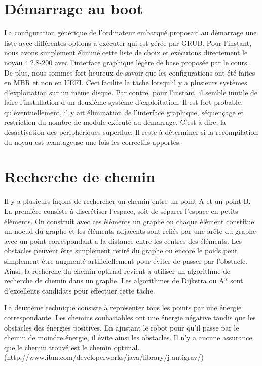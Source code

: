 \section{Démarrage au boot}
La configuration générique de l’ordinateur embarqué proposait au démarrage une liste avec différentes options à exécuter qui est gérée par GRUB. Pour l’instant, nous avons simplement éliminé cette liste de choix et exécutons directement le noyau 4.2.8-200 avec l’interface graphique légère de base proposée par le cours. De plus, nous sommes fort heureux de savoir que les configurations ont été faites en MBR et non en UEFI. Ceci facilite la tâche lorsqu’il y a plusieurs systèmes d’exploitation sur un même disque. Par contre, pour l’instant, il semble inutile de faire l’installation d’un deuxième système d’exploitation. Il est fort probable, qu’éventuellement, il y ait élimination de l’interface graphique, séquençage et restriction du nombre de module exécuté au démarrage. C’est-à-dire, la désactivation des périphériques superflue. Il reste à déterminer si la recompilation du noyau est avantageuse une fois les correctifs apportés.    


\section{Recherche de chemin}
Il y a plusieurs façons de rechercher un chemin entre un point A et un point B.
La première consiste à discrétiser l'espace, soit de séparer l'espace en
petits éléments.  On construit avec ces éléments un graphe ou chaque élément
constitue un noeud du graphe et les éléments adjacents sont reliés par une arête
du graphe avec un point correspondant a la distance entre les centres des
éléments.  Les obstacles peuvent être simplement retiré du graphe ou encore le
poids peut simplement être augmenté artificiellement pour éviter de passer par
l'obstacle.  Ainsi, la recherche du chemin optimal revient à utiliser un
algorithme de recherche de chemin dans un graphe.  Les algorithmes de Dijkstra
ou A* sont d'excellents candidats pour effectuer cette tâche.

La deuxième technique consiste à représenter tous les points par une énergie
correspondante.  Les chemins souhaitables ont une énergie négative tandis que
les obstacles des énergies positives.  En ajustant le robot pour qu'il passe par
le chemin de moindre énergie, il évite ainsi les obstacles.  Il n'y a aucune
assurance que le chemin trouvé est le chemin optimal.
(http://www.ibm.com/developerworks/java/library/j-antigrav/)

